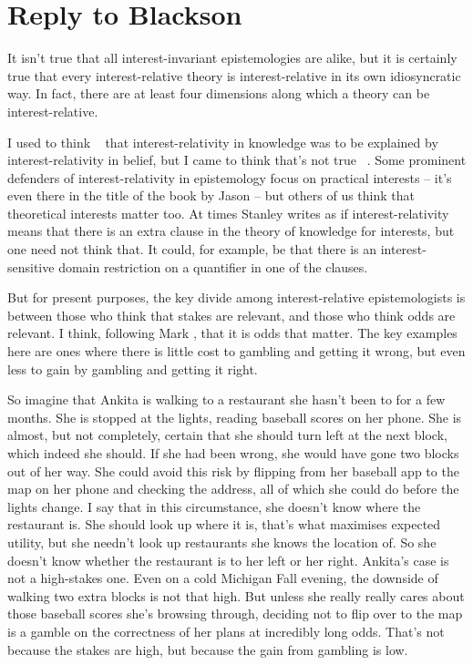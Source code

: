 \chapter{Reply to Blackson}


It isn't true that all interest-invariant epistemologies are alike, but it is certainly true that every interest-relative theory is interest-relative in its own idiosyncratic way. In fact, there are at least four dimensions along which a theory can be interest-relative.

I used to think ~\citep{Weatherson2005-WEACWD} that interest-relativity in knowledge was to be explained by interest-relativity in belief, but I came to think that's not true ~\citep{Weatherson2012-WEAKBI}. Some prominent defenders of interest-relativity in epistemology focus on practical interests -- it's even there in the title of the book by Jason  \citet{Stanley2005-STAKAP} -- but others of us think that theoretical interests matter too. At times Stanley writes as if interest-relativity means that there is an extra clause in the theory of knowledge for interests, but one need not think that. It could, for example, be that there is an interest-sensitive domain restriction on a quantifier in one of the clauses.

But for present purposes, the key divide among interest-relative epistemologists is between those who think that stakes are relevant, and those who think odds are relevant. I think, following Mark  \citet{Schroeder2012}, that it is odds that matter. The key examples here are ones where there is little cost to gambling and getting it wrong, but even less to gain by gambling and getting it right. 

So imagine that Ankita is walking to a restaurant she hasn't been to for a few months. She is stopped at the lights, reading baseball scores on her phone. She is almost, but not completely, certain that she should turn left at the next block, which indeed she should. If she had been wrong, she would have gone two blocks out of her way. She could avoid this risk by flipping from her baseball app to the map on her phone and checking the address, all of which she could do before the lights change. I say that in this circumstance, she doesn't know where the restaurant is. She should look up where it is, that's what maximises expected utility, but she needn't look up restaurants she knows the location of. So she doesn't know whether the restaurant is to her left or her right. Ankita's case is not a high-stakes one. Even on a cold Michigan Fall evening, the downside of walking two extra blocks is not that high. But unless she really really cares about those baseball scores she's browsing through, deciding not to flip over to the map is a gamble on the correctness of her plans at incredibly long odds. That's not because the stakes are high, but because the gain from gambling is low.

